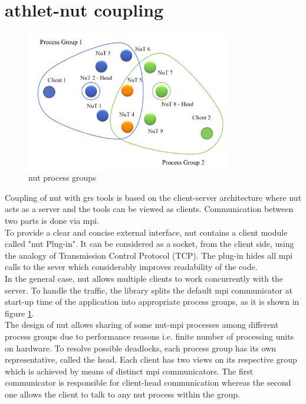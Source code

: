 \section{\gls{athlet}-\gls{nut} coupling}
\label{sec:athlet-nut-coupling}

\figpointer{\ref{fig:introduction-nut-process-groups}}
\begin{figure}[htpb]
  \centering
  \includegraphics[width=0.8\textwidth]{figures/introduction-nut-process-groups.png}
\caption{\gls{nut} process groups}
\label{fig:introduction-nut-process-groups}
\end{figure}

Coupling of \gls{nut} with \gls{grs} tools is based on the client-server architecture where \gls{nut} acts as a server and the tools can be viewed as clients. Communication between two parts is done via \gls{mpi}.\\


To provide a clear and concise external interface, \gls{nut} contains a client module called "\gls{nut} Plug-in". It can be  considered as a socket, from the client side, using the analogy of Transmission Control Protocol (TCP). The plug-in hides all \gls{mpi} calls to the sever which considerably improves readability of the code.\\


In the general case, \gls{nut} allows multiple clients to work concurrently with the server. To handle the traffic, the library splits the default \gls{mpi} communicator at start-up time of the application into appropriate process groups, as it is shown in figure \ref{fig:introduction-nut-process-groups}.\\



The design of \gls{nut} allows sharing of some \gls{nut}-\gls{mpi} processes among different process groups due to performance reasons i.e. finite number of processing units on hardware. To resolve possible deadlocks, each process group has its own representative, called the head. Each client has two views on its respective group which is achieved by means of distinct \gls{mpi} communicators. The first communicator is responsible for client-head communication whereas the second one allows the client to talk to any \gls{nut} process within the group.\\



